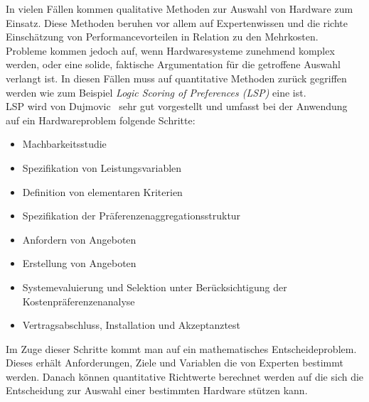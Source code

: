 In vielen F\"allen kommen qualitative Methoden zur Auswahl von Hardware zum Einsatz. Diese Methoden beruhen vor allem auf Expertenwissen und die richte Einsch\"atzung von Performancevorteilen in Relation zu den Mehrkosten.\\
Probleme kommen jedoch auf, wenn Hardwaresysteme zunehmend komplex werden, oder eine solide, faktische Argumentation f\"ur die getroffene Auswahl verlangt ist. In diesen F\"allen muss auf quantitative Methoden zur\"uck gegriffen werden wie zum Beispiel \textit{Logic Scoring of Preferences (LSP)} eine ist.\\
LSP wird von Dujmovic~\cite{Dujmovic1996} sehr gut vorgestellt und umfasst bei der Anwendung auf ein Hardwareproblem folgende Schritte:
\begin{itemize}
\item Machbarkeitsstudie
\item Spezifikation von Leistungsvariablen
\item Definition von elementaren Kriterien
\item Spezifikation der Pr\"aferenzenaggregationsstruktur
\item Anfordern von Angeboten
\item Erstellung von Angeboten 
\item Systemevaluierung und Selektion unter Ber\"ucksichtigung der Kostenpr\"aferenzenanalyse
\item Vertragsabschluss, Installation und Akzeptanztest
\end{itemize}
Im Zuge dieser Schritte kommt man auf ein mathematisches Entscheideproblem. Dieses erh\"alt Anforderungen, Ziele und Variablen die von Experten bestimmt werden. Danach k\"onnen quantitative Richtwerte berechnet werden auf die sich die Entscheidung zur Auswahl einer bestimmten Hardware st\"utzen kann.
